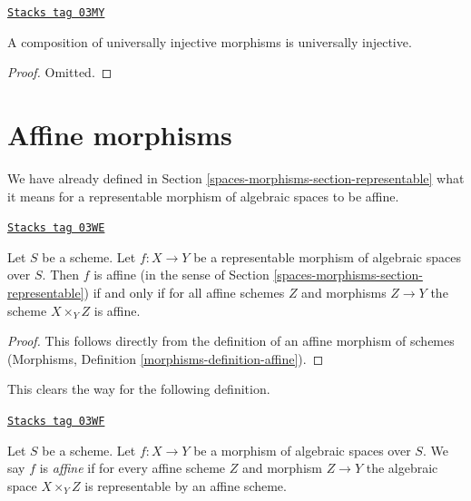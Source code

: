 \begin{lemma}
\label{spaces-morphisms-lemma-composition-universally-injective}
\href{https://stacks.math.columbia.edu/tag/03MY}{\texttt{Stacks tag 03MY}}

A composition of universally injective morphisms is universally injective.
\end{lemma}

\begin{proof}
Omitted.
\end{proof}

\section{Affine morphisms}
\label{spaces-morphisms-section-affine}
We have already defined in Section \ref{spaces-morphisms-section-representable}
what it means for a representable morphism of algebraic spaces
to be affine.

\begin{lemma}
\label{spaces-morphisms-lemma-affine-representable}
\href{https://stacks.math.columbia.edu/tag/03WE}{\texttt{Stacks tag 03WE}}

Let $S$ be a scheme. Let $f : X \to Y$ be a representable morphism
of algebraic spaces over $S$. Then
$f$ is affine (in the sense of Section \ref{spaces-morphisms-section-representable})
if and only if for all affine schemes $Z$
and morphisms $Z \to Y$ the scheme $X \times_Y Z$ is affine.
\end{lemma}

\begin{proof}
This follows directly from the definition of an affine morphism of schemes
(Morphisms, Definition \ref{morphisms-definition-affine}).
\end{proof}

This clears the way for the following definition.

\begin{definition}[Affine]
\label{spaces-morphisms-definition-affine}
\href{https://stacks.math.columbia.edu/tag/03WF}{\texttt{Stacks tag 03WF}}

Let $S$ be a scheme.
Let $f : X \to Y$ be a morphism of algebraic spaces over $S$.
We say $f$ is {\it affine} if for every affine scheme $Z$ and
morphism $Z \to Y$ the algebraic space $X \times_Y Z$ is representable
by an affine scheme.
\end{definition}

